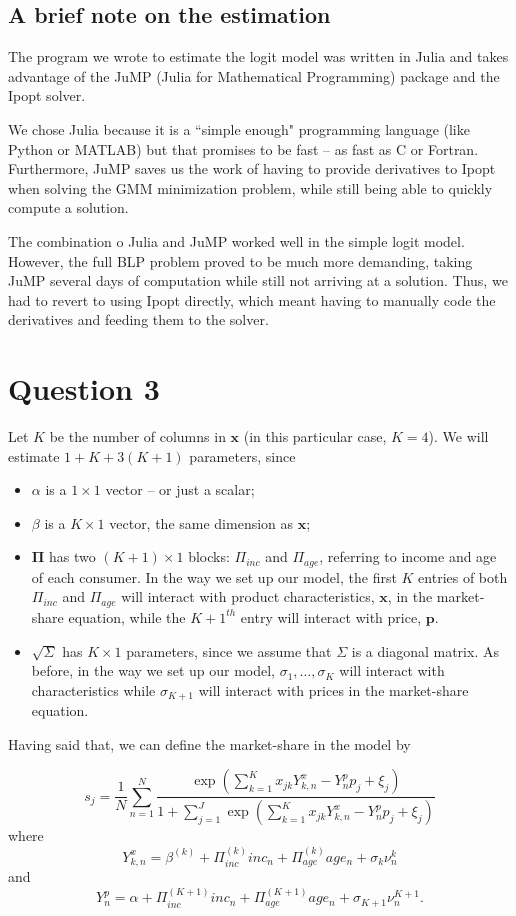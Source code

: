 \documentclass[a4paper,11pt]{article}
\begin{document}
\subsection*{A brief note on the estimation}

The program we wrote to estimate the logit model was written in Julia and takes advantage of the JuMP (Julia for Mathematical Programming) package and the Ipopt solver.

We chose Julia because it is a ``simple enough" programming language (like Python or MATLAB) but that promises to be fast -- as fast as C or Fortran. Furthermore, JuMP saves us the work of having to provide derivatives to Ipopt when solving the GMM minimization problem, while still being able to quickly compute a solution.

The combination o Julia and JuMP worked well in the simple logit model. However, the full BLP problem proved to be much more demanding, taking JuMP several days of computation while still not arriving at a solution. Thus, we had to revert to using Ipopt directly, which meant having to manually code the derivatives and feeding them to the solver.

\section*{Question 3}

Let $K$ be the number of columns in $\mathbf{x}$ (in this particular case, $K = 4$). We will estimate $1 + K + 3(K+1)$ parameters, since
\begin{itemize}
\item $\alpha$ is a $1\times 1$ vector -- or just a scalar;
\item $\beta$ is a $K \times 1$ vector, the same dimension as $\mathbf{x}$;
\item $\mathbf{\Pi}$ has two $(K+1) \times 1$ blocks: $\Pi_{inc}$ and $\Pi_{age}$, referring to income and age of each consumer. In the way we set up our model, the first $K$ entries of both $\Pi_{inc}$ and $\Pi_{age}$ will interact with product characteristics, $\mathbf{x}$, in the market-share equation, while the $K+1^{th}$ entry will interact with price, $\mathbf{p}$.
\item $\sqrt{\Sigma}$ has $K\times 1$ parameters, since we assume that $\Sigma$ is a diagonal matrix. As before, in the way we set up our model, $\sigma_{1}, \ldots, \sigma_{K}$ will interact with characteristics while $\sigma_{K+1}$ will interact with prices in the market-share equation.
\end{itemize}

Having said that, we can define the market-share in the model by

\[ s_j = \frac{1}{N}\sum_{n=1}^N \frac{\exp\left(\sum_{k=1}^K
x_{jk}Y^x_{k,n} - Y^p_{n}p_j + \xi_j \right)}{ 1 + \sum_{j = 1}^J\exp\left(\sum_{k=1}^K x_{jk}Y^x_{k,n} - Y^p_{n}p_j + \xi_j \right)} \]
where
\[ Y^x_{k,n} = \beta^{(k)} + \Pi_{inc}^{(k)}inc_n + \Pi_{age}^{(k)}age_n + \sigma_k \nu_n^k\]
and
\[ Y^p_{n} = \alpha + \Pi_{inc}^{(K+1)}inc_n + \Pi_{age}^{(K+1)}age_n + \sigma_{K+1}\nu_n^{K+1}. \]
\end{document}
